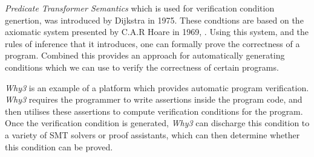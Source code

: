 \textit{Predicate Transformer Semantics} which is used for verification condition genertion, was introduced by Dijkstra in 1975\cite{Dijkstra}.
These condtions are based on the axiomatic system presented by C.A.R Hoare in 1969, \cite{Hoare}. Using this system, and the rules of inference that it introduces, one can formally prove the correctness of a program.
Combined this provides an approach for automatically generating conditions which we can use to verify the correctness of certain programs.



\textit{Why3} is an example of a platform which provides automatic program verification.
\textit{Why3} requires the programmer to write assertions inside the program code, and then utilises these assertions to compute verification conditions for the program.
Once the verification condition is generated, \textit{Why3} can discharge this condition to a variety of SMT solvers or proof assistants, which can then determine whether this condition can be proved.

